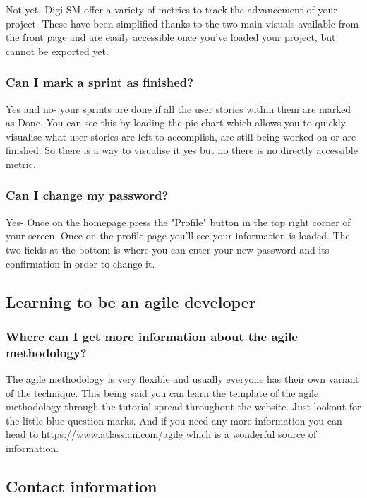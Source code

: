 \documentclass{article}
\begin{document}
Not yet- Digi-SM offer a variety of metrics to track the advancement of your project. These have been simplified thanks to the two main visuals available from the front page and are easily accessible once you've loaded your project, but cannot be exported yet. 

\subsubsection{Can I mark a sprint as finished?}

Yes and no- your sprints are done if all the user stories within them are marked as Done. You can see this by loading the pie chart which allows you to quickly visualise what user stories are left to accomplish, are still being worked on or are finished.
So there is a way to visualise it yes but no there is no directly accessible metric.


\subsubsection{Can I change my password?}

Yes- Once on the homepage press the "Profile" button in the top right corner of your screen. Once on the profile page you’ll see your information is loaded. The two fields at the bottom is where you can enter your new password and its confirmation in order to change it.

\subsection{Learning to be an agile developer}

\subsubsection{Where can I get more information about the agile methodology?}

The agile methodology is very flexible and usually everyone has their own variant of the technique. This being said you can learn the template of the agile methodology through the tutorial spread throughout the website. Just lookout for the little blue question marks.
And if you need any more information you can head to https://www.atlassian.com/agile which is a wonderful source of information.

\subsection{Contact information}
\label{sec:ContactInfo}
\end{document}
